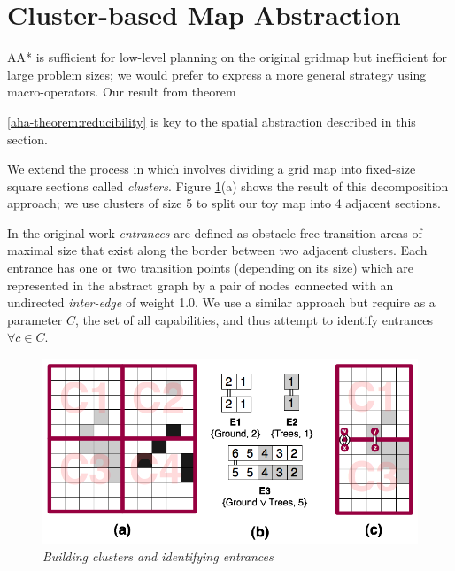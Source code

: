 \section{Cluster-based Map Abstraction}
\label{aha:mapabstraction}
AA* is sufficient for low-level planning on the original gridmap but inefficient for large problem sizes; we would prefer to express a more general strategy using macro-operators.
Our result from theorem {\ref{aha-theorem:reducibility} is key to the spatial abstraction described in this section. 
\par \indent
We extend the process in \cite{botea04} which involves dividing a grid map into fixed-size square sections called \emph{clusters}. 
Figure \ref{aha-fig:clustersandentrances}(a) shows the result of this decomposition approach; we use clusters of size 5 to split our toy map into 4 adjacent sections. 
\par \indent
In the original work \emph{entrances} are defined as obstacle-free transition areas of maximal size that exist along the border between two adjacent clusters.
Each entrance has one or two transition points (depending on its size) which are represented in the abstract graph by a pair of nodes connected with an undirected \emph{inter-edge} of weight 1.0. 
We use a similar approach but require as a parameter $C$, the set of all capabilities, and thus attempt to identify entrances $\forall c \in C$. 
\begin{figure}[htbp]
	\vspace{-17pt}
        \caption{\emph{Building clusters and identifying entrances} }
        \begin{center}
                        \includegraphics[scale=0.30, trim = 20mm 12mm 20mm 5mm]{diagrams/identifying_entrances.png}
        \end{center}
        \label{aha-fig:clustersandentrances}
	\vspace{-6pt}

\end{figure}}
